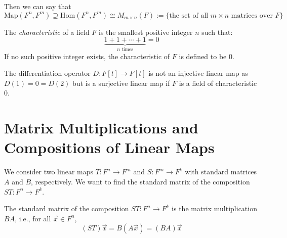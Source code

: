 \documentclass[
	11pt, %
	fleqn, %
	a4paper, %
]{LegrandOrangeBook}
\newcommand{\Hom}[2]{\text{Hom}(#1, #2)} %
\begin{document}
Then we can say that 
\[
    \text{Map}(F^n, F^m) \supseteq \Hom{F^n}{F^m} \cong M_{m \times n} (F) := \{ \text{the set of all } m \times n \text{ matrices over } F \}
\]

\begin{definition}
    The \emph{characteristic} of a field $F$ is the smallest positive integer $n$ such that:
    \[
        \underbrace{1 + 1 + \cdots + 1}_{n \text{ times}} = 0
    \]
    If no such positive integer exists, the characteristic of $F$ is defined to be $0$.    
\end{definition}

\begin{example}
    The differentiation operator $D: F[t] \to F[t]$ is not an injective linear map as $D(1) = 0 = D(2)$ but is a surjective linear map if $F$ is a field of characteristic $0$.
\end{example}


\newpage

\section{Matrix Multiplications and Compositions of Linear Maps}

We consider two linear maps $T: F^n \to F^m$ and $S: F^m \to F^k$ with standard matrices $A$ and $B$, respectively. We want to find the standard matrix of the composition $ST: F^n \to F^k$.

\begin{center}
\end{center}

\begin{proposition}
    The standard matrix of the composition $ST: F^n \to F^k$ is the matrix multiplication $BA$, i.e., for all $\vec{x} \in F^n$,
    \[
        (ST)\vec{x} = B(A\vec{x}) = (BA)\vec{x}
    \]
\end{proposition}
\end{document}

